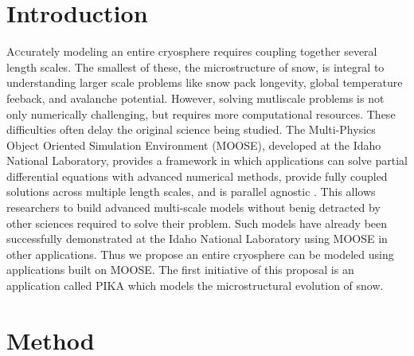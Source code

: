 \documentclass[twoside]{article}
\begin{document}
\begin{multicols}{2} %
\section{Introduction}

\lettrine[nindent=0em,lines=2]{A}ccurately modeling an entire cryosphere requires coupling together several length scales. The smallest of these, the microstructure of snow, is integral to understanding larger scale problems like snow pack longevity, global temperature feeback, and avalanche potential. However, solving mutliscale problems is not only numerically challenging, but requires more computational resources. These difficulties often delay the original science being studied. The Multi-Physics Object Oriented Simulation Environment (MOOSE), developed at the Idaho National Laboratory, provides a framework in which applications can solve partial differential equations with advanced numerical methods, provide fully coupled solutions across multiple length scales, and is parallel agnostic \cite{Gaston_2009}. This allows researchers to build advanced multi-scale models without benig detracted by other sciences required to solve their problem. Such models have already been successfully demonstrated at the Idaho National Laboratory using MOOSE in other applications. Thus we propose an entire cryosphere can be modeled using applications built on MOOSE. The first initiative of this proposal is an application called PIKA which models the microstructural evolution of snow.

\section{Method}


\end{multicols}
\end{document}
